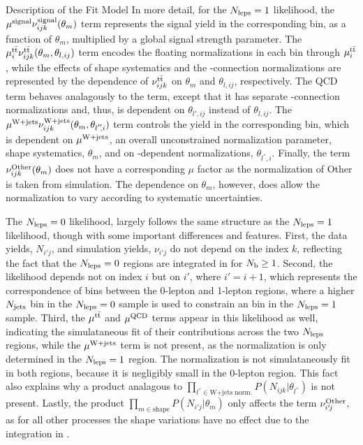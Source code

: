 \begin{section}{Description of the Fit Model}
In more detail, for the $N_{\mathrm{leps}} = 1$ likelihood, the $\mu^{\text{signal}}\nu^{\text{signal}}_{ijk}(\theta_m)$ term represents the signal yield in the corresponding bin, as a function of $\theta_m$, multiplied by a global signal strength parameter.
The $\mu^{\mathrm{t\bar{t}}}_{i}\nu^{\mathrm{t\bar{t}}}_{ijk}(\theta_m, \theta_{l,ij})$ term encodes the floating normalizations in each \Njets bin through $\mu^{\mathrm{t\bar{t}}}_{i}$, while the effects of shape systematics and the \MJ-connection normalizations are represented by the dependence of $\nu^{\mathrm{t\bar{t}}}_{ijk}$ on $\theta_m$ and $\theta_{l,ij}$, respectively.
The QCD term behaves analagously to the \ttbar term, except that it has separate \MJ-connection normalizations and, thus, is dependent on $\theta_{l'\!,ij}$ instead of $\theta_{l,ij}$.
The $\mu^{\mathrm{W+jets}}\nu^{\mathrm{W+jets}}_{ijk}(\theta_m, \theta_{l^{''}\!\!,i})$ term controls the \Wjets yield in the corresponding bin, which is dependent on $\mu^{\mathrm{W+jets}}$, an overall unconstrained normalization parameter, shape systematics, $\theta_m$, and on \Njets-dependent normalizations, $\theta_{l^{''}\!\!,i}$.
Finally, the term $\nu^{\text{Other}}_{ijk}(\theta_m)$ does not have a corresponding $\mu$ factor as the normalization of Other is taken from simulation.
The dependence on $\theta_m$, however, does allow the normalization to vary according to systematic uncertainties.

The $N_{\mathrm{leps}} = 0$ likelihood, largely follows the same structure as the $N_{\mathrm{leps}} = 1$ likelihood, though with some important differences and features.
First, the data yields, $N_{i'\!j}$, and simulation yields, $\nu_{i'\!j}$ do not depend on the index $k$, reflecting the fact that the $N_{\mathrm{leps}} = 0$ regions are integrated in \Nb for $N_{\mathrm{b}} \geq 1$.
Second, the likelihood depends not on index $i$ but on $i'$, where $i' = i + 1$, which represents the correspondence of \Njets bins between the 0-lepton and 1-lepton regions, where a higher $N_{\mathrm{jets}}$ bin in the $N_{\mathrm{leps}} = 0$ sample is used to constrain an \Njets bin in the $N_{\mathrm{leps}} = 1$ sample.
Third, the $\mu^{\mathrm{t\bar{t}}}$ and $\mu^{\text{QCD}}$ terms appear in this likelihood as well, indicating the simulataneous fit of their contributions across the two $N_{\mathrm{leps}}$ regions, while the $\mu^{\mathrm{W+jets}}$ term is not present, as the \Wjets normalization is only determined in the $N_{\mathrm{leps}} = 1$ region.
The \Wjets normalization is not simulataneously fit in both \Nleps regions, because it is negligibly small in the 0-lepton region.
This fact also explains why a product analagous to $\displaystyle \prod_{l^{''}\!\in\text{W+jets norm.}} P(N_{ijk}|\theta_{l^{''}})$ is not present.
Lastly, the product $\displaystyle \prod_{m\in\text{shape}} P(N_{i'\!j}|\theta_{m})$ only affects the term $\nu^{\text{Other}}_{i'\!j}$, as for all other processes the shape variations have no effect due to the integration in \Nb.

\end{section}


